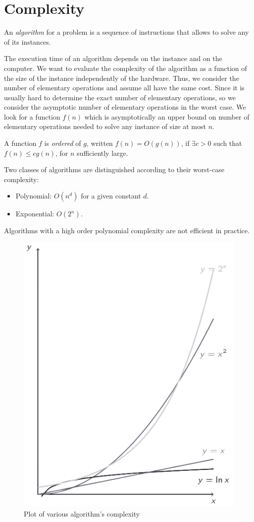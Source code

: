 \documentclass[12pt, a4paper]{report}
\newtheorem[style=M,bodystyle=\normalfont]{theorem}{Theorem}
\newtheorem[style=M,bodystyle=\normalfont]{corollary}{Corollary}
\newtheorem[style=M,bodystyle=\normalfont]{lemma}{Lemma}
\newtheorem[style=M,bodystyle=\normalfont]{definition}{Definition}
\begin{document}
    \section{Complexity}
    \begin{definition}
        An \emph{algorithm} for a problem is a sequence of instructions that allows to solve any of its instances.
    \end{definition}
    The execution time of an algorithm depends on the instance and on the computer. We want to evaluate the complexity of the algorithm as a function of the size of the instance
    independently of the hardware. Thus, we consider the number of elementary operations and assume all have the same cost. Since it is usually hard to determine the exact number of
    elementary operations, so we consider the asymptotic number of elementary operations in the worst case. We look for a function $f(n)$ which is asymptotically an upper bound on 
    number of elementary operations needed to solve any instance of size at most $n$. 
    \begin{definition}
        A function $f$ is \emph{ordered} of $g$, written $f(n)=O(g(n))$, if $\exists c > 0$ such that $f(n) \leq cg(n)$, for $n$ sufficiently large. 
    \end{definition}
    Two classes of algorithms are distinguished according to their worst-case complexity:
    \begin{itemize}
        \item Polynomial: $O(n^d)$ for a given constant $d$.
        \item Exponential: $O(2^n)$. 
    \end{itemize}
    Algorithms with a high order polynomial complexity are not efficient in practice.
    \begin{figure}[H]
        \centering
        \includegraphics[width=0.25\linewidth]{images/complexity.png}
        \caption{Plot of various algorithm's complexity}
    \end{figure}
\end{document}
